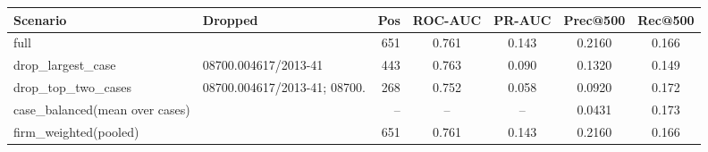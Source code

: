 \begin{tabular}{llrcccc}
\toprule
Scenario & Dropped & Pos & ROC-AUC & PR-AUC & Prec@500 & Rec@500 \\
\midrule
full &  & 651 & 0.761 & 0.143 & 0.2160 & 0.166 \\
drop\_largest\_case & 08700.004617/2013-41 & 443 & 0.763 & 0.090 & 0.1320 & 0.149 \\
drop\_top\_two\_cases & 08700.004617/2013-41; 08700. & 268 & 0.752 & 0.058 & 0.0920 & 0.172 \\
case\_balanced(mean over cases) &  & -- & -- & -- & 0.0431 & 0.173 \\
firm\_weighted(pooled) &  & 651 & 0.761 & 0.143 & 0.2160 & 0.166 \\
\bottomrule
\end{tabular}

